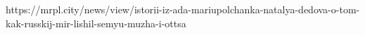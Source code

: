  
 
 
 
 

https://mrpl.city/news/view/istorii-iz-ada-mariupolchanka-natalya-dedova-o-tom-kak-russkij-mir-lishil-semyu-muzha-i-ottsa
